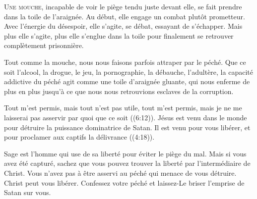




\lettrine{U}{ne mouche}, 
 incapable de voir le piège tendu juste devant elle,
 se fait prendre dans la toile de l'araignée.
 Au début, elle engage un combat plutôt prometteur.
 Avec l'énergie du désespoir, elle s'agite, se débat,
 essayant de s'échapper.
 Mais plus elle s'agite, plus elle s'englue dans la toile
 pour finalement se retrouver complètement prisonnière. 

Tout comme la mouche, nous nous faisons parfois attraper
 par le péché.
 Que ce soit l'alcool, la drogue, le jeu, la pornographie,
 la débauche, l'adultère, la capacité addictive du péché
 agit comme une toile d'araignée gluante, qui nous enferme
 de plus en plus jusqu'à ce que nous nous retrouvions
 esclaves de la corruption. 


\Og Tout m'est permis, mais tout n'est pas utile,
 tout m'est permis, mais je ne me laisserai pas asservir
 par quoi que ce soit \Fg{} ((6:12)).
 Jésus est venu dans le monde pour détruire
 la puissance dominatrice de Satan.
 Il est venu pour vous libérer,
 et \Og pour proclamer aux captifs la délivrance \Fg{} ((4:18)).

Sage est l'homme qui use de sa liberté pour éviter le piège du mal.
 Mais si vous avez été capturé, sachez que vous pouvez trouver la liberté
 par l'intermédiaire de Christ.
 Vous n'avez pas à être asservi au péché qui menace de vous détruire.
 Christ peut vous libérer. Confessez votre péché et laissez-Le briser
 l'emprise de Satan sur vous. 

\dvrule




